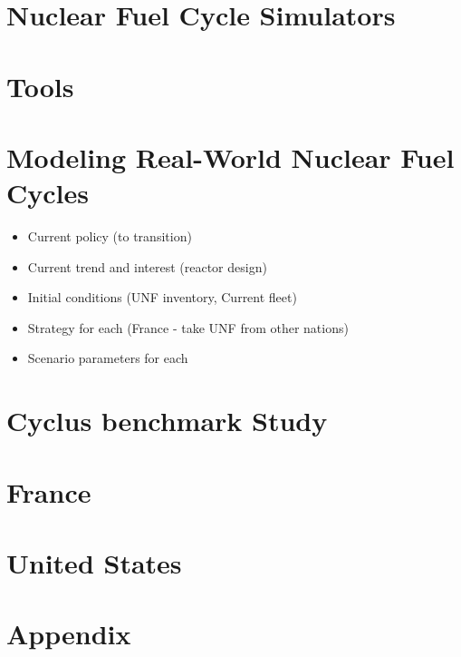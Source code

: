 \documentclass{report}
\begin{document}
\chapter{Nuclear Fuel Cycle Simulators}



\chapter{Tools}



\chapter{Modeling Real-World Nuclear Fuel Cycles}
\begin{itemize}
    \item Current policy (to transition)
    \item Current trend and interest (reactor design)
    \item Initial conditions (UNF inventory, Current fleet)
    \item Strategy for each (France - take UNF from other nations)
    \item Scenario parameters for each
\end{itemize}

\chapter{Cyclus benchmark Study}


\FloatBarrier


\chapter{France}



\chapter{United States}


\chapter{Appendix}






\end{document}
